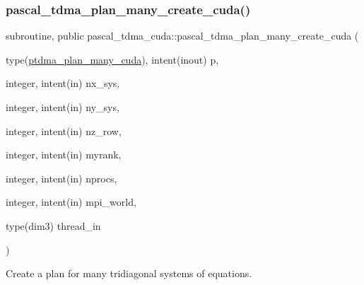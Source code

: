 \subsubsection{\texorpdfstring{pascal\+\_\+tdma\+\_\+plan\+\_\+many\+\_\+create\+\_\+cuda()}{pascal\_tdma\_plan\_many\_create\_cuda()}}
{\footnotesize\ttfamily subroutine, public pascal\+\_\+tdma\+\_\+cuda\+::pascal\+\_\+tdma\+\_\+plan\+\_\+many\+\_\+create\+\_\+cuda (\begin{DoxyParamCaption}\item[{type(\hyperlink{structpascal__tdma__cuda_1_1ptdma__plan__many__cuda}{ptdma\+\_\+plan\+\_\+many\+\_\+cuda}), intent(inout)}]{p,  }\item[{integer, intent(in)}]{nx\+\_\+sys,  }\item[{integer, intent(in)}]{ny\+\_\+sys,  }\item[{integer, intent(in)}]{nz\+\_\+row,  }\item[{integer, intent(in)}]{myrank,  }\item[{integer, intent(in)}]{nprocs,  }\item[{integer, intent(in)}]{mpi\+\_\+world,  }\item[{type(dim3)}]{thread\+\_\+in }\end{DoxyParamCaption})}



Create a plan for many tridiagonal systems of equations. 


